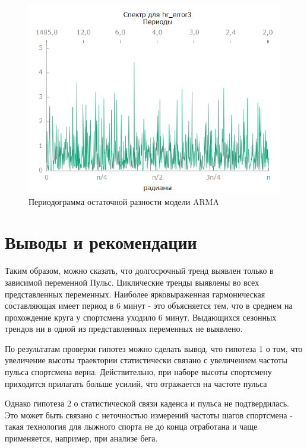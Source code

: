 \documentclass[a4paper,12pt]{article}
\begin{document}
\begin{figure}[H]
	\centering
	\includegraphics[width=0.5\linewidth]{../[graphics]/hr_error3_spectr.png}
	\caption{Периодограмма остаточной разности модели ARMA}
	\label{fig:hr_error3_spectr}
\end{figure}


\section{Выводы и рекомендации}
Таким образом, можно сказать, что долгосрочный тренд выявлен только в зависимой переменной Пульс. Циклические тренды выявлены во всех представленных переменных. Наиболее ярковыраженная гармоническая составляющая имеет период в 6 минут - это объясняется тем, что в среднем на прохождение круга у спортсмена уходило 6 минут. Выдающихся сезонных трендов ни в одной из представленных переменных не выявлено.  

По результатам проверки гипотез можно сделать вывод, что гипотеза 1 о том, что увеличение высоты траектории статистически связано с увеличением частоты пульса спортсмена верна. Действительно, при наборе высоты спортсмену приходится прилагать больше усилий, что отражается на частоте пульса

Однако гипотеза 2 о статистической связи каденса и пульса не подтвердилась. Это может быть связано с неточностью измерений частоты шагов спортсмена - такая технология для лыжного спорта не до конца отработана и чаще применяется, например, при анализе бега.
\end{document}
